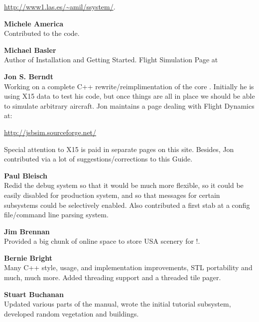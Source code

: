   \href{http://www1.las.es/~amil/ssystem/}{http://www1.las.es/\~{}amil/ssystem/}.
 \medskip

 \noindent \textbf{Michele America}\\
  Contributed to the  code.
 \medskip

\noindent \textbf{Michael Basler}\\
 Author of Installation and Getting Started. Flight Simulation Page at
  \medskip

\medskip

\noindent \textbf{Jon S. Berndt}\\
 Working on a complete C++ rewrite/reimplimentation of the core .
  Initially he is using X15 data to test his code, but once things are
  all in place we should be able to simulate arbitrary aircraft. Jon
  maintains a page dealing with Flight Dynamics at:
   \medskip

  \href{http://jsbsim.sourceforge.net/}{http://jsbsim.sourceforge.net/}
   \medskip

\noindent
  Special attention to X15 is paid in separate pages on this site. Besides, Jon
  contributed via a lot of suggestions/corrections to this Guide.
\medskip

\noindent \textbf{Paul Bleisch}\\
  Redid the debug system so that it would be much more
  flexible, so it could be easily disabled for production system, and
  so that messages for certain subsystems could be selectively
  enabled. Also contributed a first stab at a config file/command line parsing
  system.
 \medskip


\noindent \textbf{Jim Brennan}\\
  Provided a big chunk of online space to store USA scenery for \FlightGear{}$!$.
 \medskip

\noindent \textbf{Bernie Bright}\\
  Many C++ style, usage, and implementation improvements, STL
  portability and much, much more.
  Added threading support and a threaded tile pager.
 \medskip

\noindent \textbf{Stuart Buchanan}\\
 Updated various parts of the manual, wrote the initial tutorial subsystem, developed
 random vegetation and buildings.
 \medskip

